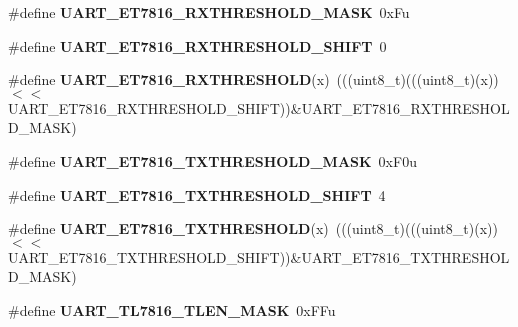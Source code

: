 \begin{DoxyCompactItemize}
\item 
\#define {\bfseries U\+A\+R\+T\+\_\+\+E\+T7816\+\_\+\+R\+X\+T\+H\+R\+E\+S\+H\+O\+L\+D\+\_\+\+M\+A\+SK}~0x\+Fu\hypertarget{group__UART__Register__Masks_ga9ef739359fd7d60427900938502e5100}{}\label{group__UART__Register__Masks_ga9ef739359fd7d60427900938502e5100}

\item 
\#define {\bfseries U\+A\+R\+T\+\_\+\+E\+T7816\+\_\+\+R\+X\+T\+H\+R\+E\+S\+H\+O\+L\+D\+\_\+\+S\+H\+I\+FT}~0\hypertarget{group__UART__Register__Masks_gacd8498adcff369769fb56dde33ce7465}{}\label{group__UART__Register__Masks_gacd8498adcff369769fb56dde33ce7465}

\item 
\#define {\bfseries U\+A\+R\+T\+\_\+\+E\+T7816\+\_\+\+R\+X\+T\+H\+R\+E\+S\+H\+O\+LD}(x)~(((uint8\+\_\+t)(((uint8\+\_\+t)(x))$<$$<$U\+A\+R\+T\+\_\+\+E\+T7816\+\_\+\+R\+X\+T\+H\+R\+E\+S\+H\+O\+L\+D\+\_\+\+S\+H\+I\+FT))\&U\+A\+R\+T\+\_\+\+E\+T7816\+\_\+\+R\+X\+T\+H\+R\+E\+S\+H\+O\+L\+D\+\_\+\+M\+A\+SK)\hypertarget{group__UART__Register__Masks_ga497482306b260f45732d82ac5503aba4}{}\label{group__UART__Register__Masks_ga497482306b260f45732d82ac5503aba4}

\item 
\#define {\bfseries U\+A\+R\+T\+\_\+\+E\+T7816\+\_\+\+T\+X\+T\+H\+R\+E\+S\+H\+O\+L\+D\+\_\+\+M\+A\+SK}~0x\+F0u\hypertarget{group__UART__Register__Masks_ga6c3c5365dc3ba6ac54a4bd4330ff60cf}{}\label{group__UART__Register__Masks_ga6c3c5365dc3ba6ac54a4bd4330ff60cf}

\item 
\#define {\bfseries U\+A\+R\+T\+\_\+\+E\+T7816\+\_\+\+T\+X\+T\+H\+R\+E\+S\+H\+O\+L\+D\+\_\+\+S\+H\+I\+FT}~4\hypertarget{group__UART__Register__Masks_ga427963f9e067b0856aa8830cae622291}{}\label{group__UART__Register__Masks_ga427963f9e067b0856aa8830cae622291}

\item 
\#define {\bfseries U\+A\+R\+T\+\_\+\+E\+T7816\+\_\+\+T\+X\+T\+H\+R\+E\+S\+H\+O\+LD}(x)~(((uint8\+\_\+t)(((uint8\+\_\+t)(x))$<$$<$U\+A\+R\+T\+\_\+\+E\+T7816\+\_\+\+T\+X\+T\+H\+R\+E\+S\+H\+O\+L\+D\+\_\+\+S\+H\+I\+FT))\&U\+A\+R\+T\+\_\+\+E\+T7816\+\_\+\+T\+X\+T\+H\+R\+E\+S\+H\+O\+L\+D\+\_\+\+M\+A\+SK)\hypertarget{group__UART__Register__Masks_ga0f26cca6a1f58b4b08ff7b471d66881d}{}\label{group__UART__Register__Masks_ga0f26cca6a1f58b4b08ff7b471d66881d}

\item 
\#define {\bfseries U\+A\+R\+T\+\_\+\+T\+L7816\+\_\+\+T\+L\+E\+N\+\_\+\+M\+A\+SK}~0x\+F\+Fu\hypertarget{group__UART__Register__Masks_ga000fb6043015c4cb478d32febfb4a913}{}\label{group__UART__Register__Masks_ga000fb6043015c4cb478d32febfb4a913}


\end{DoxyCompactItemize}
